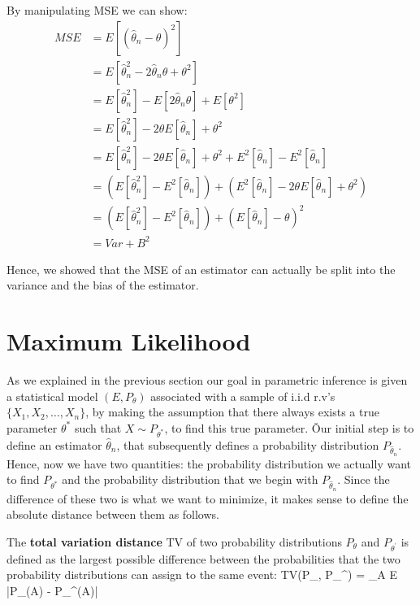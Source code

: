 By manipulating MSE we can show:
\begin{align*}
MSE &= E[(\hat{\theta}_{n} - \theta)^2] \\
&= E[\hat{\theta}_{n}^2 - 2\hat{\theta}_{n}\theta + \theta^2] \\
&= E[\hat{\theta}_{n}^2] - E[2 \hat{\theta}_{n} \theta] + E[\theta^2] \\
&= E[\hat{\theta}_{n}^2] - 2 \theta E[\hat{\theta}_{n}] + \theta^2 \\
&= E[\hat{\theta}_{n}^2] - 2 \theta E[\hat{\theta}_{n}] + \theta^2 + E^2[\hat{\theta}_{n}] - E^2[\hat{\theta}_{n}] \\
&= (E[\hat{\theta}_{n}^2] - E^2[\hat{\theta}_{n}]) + (E^2[\hat{\theta}_{n}] - 2 \theta E[\hat{\theta}_{n}] + \theta^2) \\
&= (E[\hat{\theta}_{n}^2] - E^2[\hat{\theta}_{n}]) + (E[\hat{\theta}_{n}] - \theta)^2 \\
&= Var + B^2
\end{align*}

Hence, we showed that the MSE of an estimator can actually be split into the variance and the bias of the estimator.

\section{Maximum Likelihood}

As we explained in the previous section our goal in parametric inference is given a statistical model $(E,
P_{\theta})$ associated with a sample of i.i.d r.v's $\{ X_{1}, X_{2}, \ldots, X_{n} \}$, by making the assumption
that there always exists a true parameter $\theta^{*}$ such that $X \sim P_{\theta^{*}}$, to find this true parameter. \v

Our initial step is to define an estimator $\hat{\theta}_{n}$, that subsequently defines a probability distribution
$P_{\hat{\theta}_{n}}$. Hence, now we have two quantities: the probability distribution we actually want to find
$P_{\theta^{*}}$ and the probability distribution that we begin with $P_{\hat{\theta}_{n}}$. Since the difference of
these two is what we want to minimize, it makes sense to define the absolute distance between them as follows.

The \textbf{total variation distance} TV of two probability distributions $P_{\theta}$ and $P_{\theta^{\prime}}$ is
defined as the largest possible difference between the probabilities that the two probability distributions can
assign to the same event:
\bse
TV(P_{\theta}, P_{\theta}^{\prime}) = \max_{A \subseteq E} |P_{\theta}(A) - P_{\theta}^{\prime}(A)|
\ese
\ed


